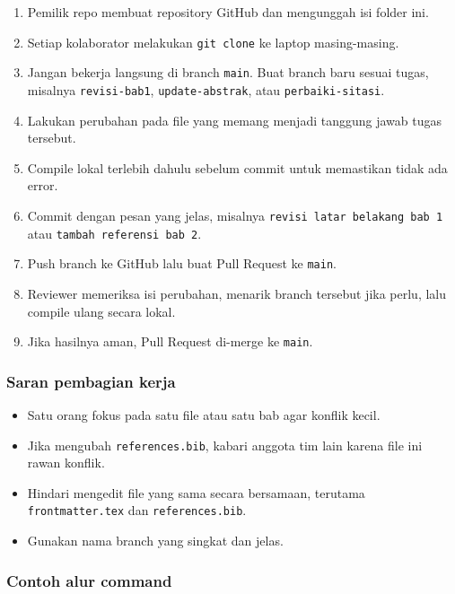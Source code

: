 \documentclass[
]{article}
\providecommand{\tightlist}{%
  \setlength{\itemsep}{0pt}\setlength{\parskip}{0pt}}
\begin{document}
\begin{enumerate}
\def\labelenumi{\arabic{enumi}.}
\tightlist
\item
  Pemilik repo membuat repository GitHub dan mengunggah isi folder ini.
\item
  Setiap kolaborator melakukan \texttt{git\ clone} ke laptop
  masing-masing.
\item
  Jangan bekerja langsung di branch \texttt{main}. Buat branch baru
  sesuai tugas, misalnya \texttt{revisi-bab1}, \texttt{update-abstrak},
  atau \texttt{perbaiki-sitasi}.
\item
  Lakukan perubahan pada file yang memang menjadi tanggung jawab tugas
  tersebut.
\item
  Compile lokal terlebih dahulu sebelum commit untuk memastikan tidak
  ada error.
\item
  Commit dengan pesan yang jelas, misalnya
  \texttt{revisi\ latar\ belakang\ bab\ 1} atau
  \texttt{tambah\ referensi\ bab\ 2}.
\item
  Push branch ke GitHub lalu buat Pull Request ke \texttt{main}.
\item
  Reviewer memeriksa isi perubahan, menarik branch tersebut jika perlu,
  lalu compile ulang secara lokal.
\item
  Jika hasilnya aman, Pull Request di-merge ke \texttt{main}.
\end{enumerate}

\subsubsection{Saran pembagian kerja}\label{saran-pembagian-kerja}

\begin{itemize}
\tightlist
\item
  Satu orang fokus pada satu file atau satu bab agar konflik kecil.
\item
  Jika mengubah \texttt{references.bib}, kabari anggota tim lain karena
  file ini rawan konflik.
\item
  Hindari mengedit file yang sama secara bersamaan, terutama
  \texttt{frontmatter.tex} dan \texttt{references.bib}.
\item
  Gunakan nama branch yang singkat dan jelas.
\end{itemize}

\subsubsection{Contoh alur command}\label{contoh-alur-command}
\end{document}

